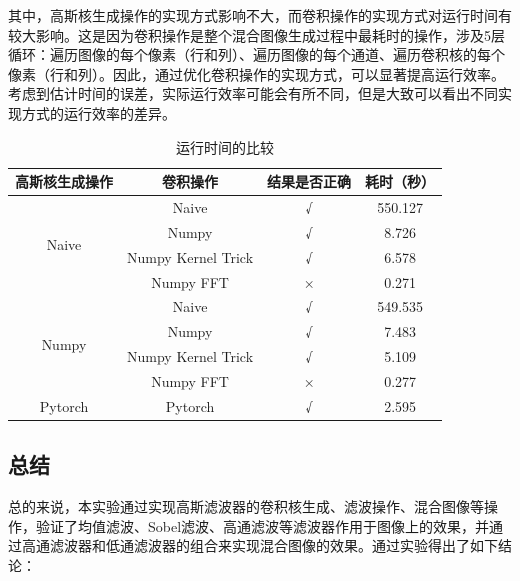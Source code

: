\documentclass{article}
\begin{document}
其中，高斯核生成操作的实现方式影响不大，而卷积操作的实现方式对运行时间有较大影响。这是因为卷积操作是整个混合图像生成过程中最耗时的操作，涉及5层循环：遍历图像的每个像素（行和列）、遍历图像的每个通道、遍历卷积核的每个像素（行和列）。因此，通过优化卷积操作的实现方式，可以显著提高运行效率。考虑到估计时间的误差，实际运行效率可能会有所不同，但是大致可以看出不同实现方式的运行效率的差异。

\begin{table}[htbp]
    \tabcolsep=8pt
    \centering
    \caption{运行时间的比较}
    \label{tab:time}
    \begin{tabular}{c|c|c|c}
        \hline
        高斯核生成操作 & 卷积操作 & 结果是否正确 & 耗时（秒） \\
        \hline
        \multirow{4}{*}{Naive} & Naive              & √ & 550.127 \\
                               & Numpy              & √ & 8.726 \\
                               & Numpy Kernel Trick & √ & 6.578 \\
                               & Numpy FFT          & × & 0.271 \\
        \hline
        \multirow{4}{*}{Numpy} & Naive              & √ & 549.535 \\
                               & Numpy              & √ & 7.483 \\
                               & Numpy Kernel Trick & √ & 5.109 \\
                               & Numpy FFT          & × & 0.277 \\
        \hline
        Pytorch                & Pytorch            & √ & 2.595 \\
        \hline
    \end{tabular}
\end{table}

\subsection{总结}

总的来说，本实验通过实现高斯滤波器的卷积核生成、滤波操作、混合图像等操作，验证了均值滤波、Sobel滤波、高通滤波等滤波器作用于图像上的效果，并通过高通滤波器和低通滤波器的组合来实现混合图像的效果。通过实验得出了如下结论：
\end{document}
